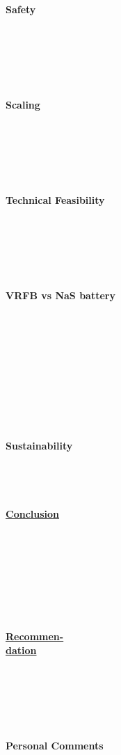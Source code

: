 \begin{parcolumns}[colwidths={1=2.5 cm, 2=10 cm, 3=2.5cm}]{3}
{\ \\ \\ \\ \\\\ \textbf{Safety} \\ \\\\ \\  \\\\ \\ \textbf{Scaling} \\\\ \\ \\  \\ \\ \\ \textbf{Technical Feasibility} \\ \\ \\ \\ \\ \\ \\ \textbf{VRFB vs NaS battery}\\ \\ \\ \\ \\ \\ \\ \\ \\ \\\\   \textbf{Sustainability} \\ \\\\ \\\\  \underline{\textbf{Conclusion}} \\ \\ \\ \\\ \\ \\\\ \\\\\underline{\textbf{Recommen-}} \\\underline{\textbf{dation}} \\ \\ \\ \\\\\\\\ \textbf{Personal Comments}
			}
			

\end{parcolumns}
